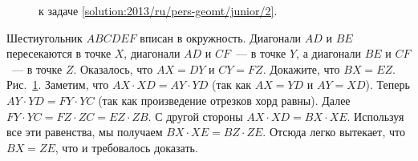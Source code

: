 \ifsolution
\begin{figure}\centering
    \caption{к задаче \ref{solution:2013/ru/pers-geomt/junior/2}.}
    \label{fig:solution:2013/ru/pers-geomt/junior/2}
\end{figure}
\fi %

\problem
Шестиугольник $ABCDEF$ вписан в окружность.
Диагонали $AD$ и $BE$ пересекаются в точке $X$, диагонали $AD$ и $CF$~--- в
точке $Y$, а диагонали $BE$ и $CF$~--- в точке $Z$.
Оказалось, что $AX = DY$ и $CY = FZ$.
Докажите, что $BX = EZ$.
\solution
\label{solution:2013/ru/pers-geomt/junior/2}
Рис.~\ref{fig:solution:2013/ru/pers-geomt/junior/2}.
Заметим, что $AX \cdot XD = AY \cdot YD$ (так как $AX=YD$ и $AY=XD$).
Теперь $AY \cdot YD = FY \cdot YC$ (так как произведение отрезков хорд равны).
Далее $FY \cdot YC = FZ \cdot ZC = EZ \cdot ZB$.
С другой стороны $AX \cdot XD = BX \cdot XE$.
Используя все эти равенства, мы получаем $BX \cdot XE = BZ \cdot ZE$.
Отсюда легко вытекает, что $BX = ZE$, что и требовалось доказать.
\endproblem

